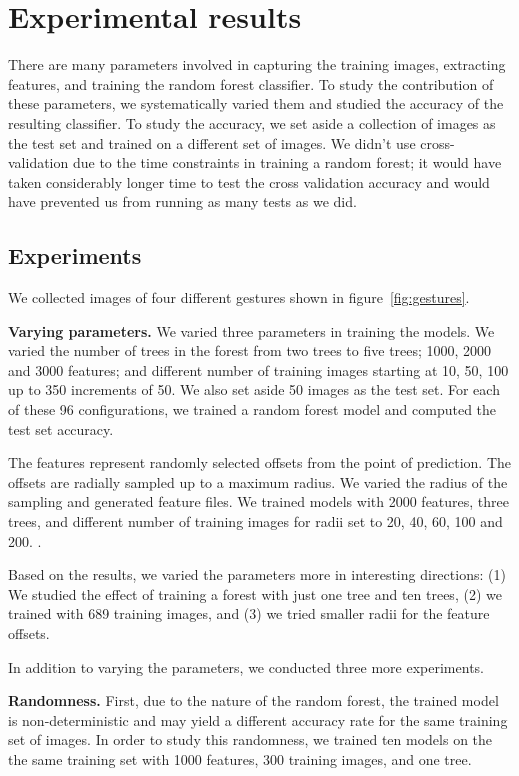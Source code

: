 \section{Experimental results}
There are many parameters involved in capturing the training images, extracting features, and training the random forest classifier. To study the contribution of these parameters, we systematically varied them and studied the accuracy of the resulting classifier. To study the accuracy, we set aside a collection of images as the test set and trained on a different set of images. We didn't use cross-validation due to the time constraints in training a random forest; it would have taken considerably longer time to test the cross validation accuracy and would  have prevented us from running as many tests as we did.

\subsection{Experiments}
We collected images of four different gestures shown in figure~\ref{fig:gestures}.

\textbf{Varying parameters.} We varied three parameters in training the models. We varied the number of trees in the forest from two trees to five trees; 1000, 2000 and 3000 features; and different number of training images starting at 10, 50, 100 up to 350 increments of 50. We also set aside 50 images as the test set. For each of these 96 configurations, we trained a random forest model and computed the test set accuracy.

The features represent randomly selected offsets from the point of prediction. The offsets are radially sampled up to a maximum radius. We varied the radius of the sampling and generated feature files. We trained models with 2000 features, three trees, and different number of training images for radii set to 20, 40, 60, 100 and 200. .

Based on the results, we varied the parameters more in interesting directions: (1) We studied the effect of training a forest with just one tree and ten trees, (2) we trained with 689 training images, and (3) we tried smaller radii for the feature offsets. 

In addition to varying the parameters, we conducted three more experiments. 

\textbf{Randomness.} First, due to the nature of the random forest, the trained model is non-deterministic and may yield a different accuracy rate for the same training set of images. In order to study this randomness, we trained ten models on the the same training set with 1000 features, 300 training images, and one tree. 

